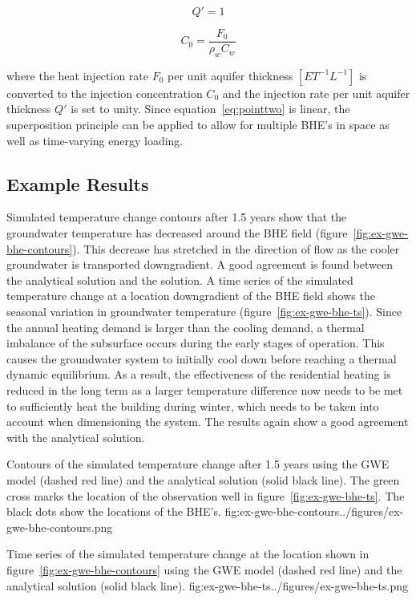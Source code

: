 \begin{equation}
    Q' = 1
    \label{eq:bhe-Q}
\end{equation}

\begin{equation}
    C_0 = \frac{F_0}{\rho_w C_w} 
    \label{eq:bhe-c0}
\end{equation}

where the heat injection rate $F_0$ per unit aquifer thickness $[ET^{-1}L^{-1}]$ is converted to the injection concentration $C_0$ and the injection rate per unit aquifer thickness $Q'$ is set to unity. Since equation~\ref{eq:pointtwo} is linear, the superposition principle can be applied to allow for multiple BHE's in space as well as time-varying energy loading.

\subsection{Example Results}

Simulated temperature change contours after 1.5 years show that the groundwater temperature has decreased around the BHE field (figure~\ref{fig:ex-gwe-bhe-contours}). This decrease has stretched in the direction of flow as the cooler groundwater is transported downgradient. A good agreement is found between the analytical solution and the \mf solution. A time series of the simulated temperature change at a location downgradient of the BHE field shows the seasonal variation in groundwater temperature (figure~\ref{fig:ex-gwe-bhe-ts}). Since the annual heating demand is larger than the cooling demand, a thermal imbalance of the subsurface occurs during the early stages of operation. This causes the groundwater system to initially cool down before reaching a thermal dynamic equilibrium. As a result, the effectiveness of the residential heating is reduced in the long term as a larger temperature difference now needs to be met to sufficiently heat the building during winter, which needs to be taken into account when dimensioning the system. The \mf results again show a good agreement with the analytical solution.

\begin{StandardFigure}{
    Contours of the simulated temperature change after 1.5 years using the \mf GWE model (dashed red line) and the analytical solution (solid black line). The green cross marks the location of the observation well in figure~\ref{fig:ex-gwe-bhe-ts}. The black dots show the locations of the BHE's.
    }{fig:ex-gwe-bhe-contours}{../figures/ex-gwe-bhe-contours.png}
\end{StandardFigure}                                 

\begin{StandardFigure}{
    Time series of the simulated temperature change at the location shown in figure~\ref{fig:ex-gwe-bhe-contours} using the \mf GWE model (dashed red line) and the analytical solution (solid black line). 
    }{fig:ex-gwe-bhe-ts}{../figures/ex-gwe-bhe-ts.png}
\end{StandardFigure}    
